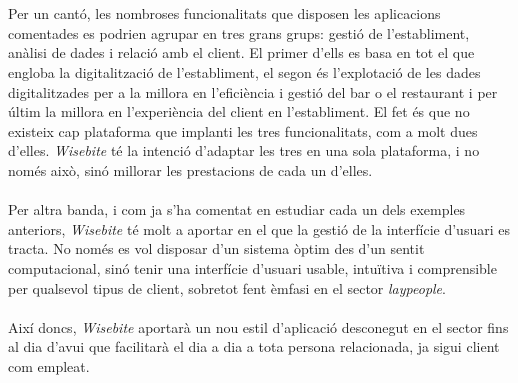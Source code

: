 \\\\
Per un cantó, les nombroses funcionalitats que disposen les aplicacions comentades es podrien agrupar en tres grans grups: gestió de l'establiment, anàlisi de dades i relació amb el client. El primer d'ells es basa en tot el que engloba la digitalització de l'establiment, el segon és l'explotació de les dades digitalitzades per a la millora en l'eficiència i gestió del bar o el restaurant i per últim la millora en l'experiència del client en l'establiment. El fet és que no existeix cap plataforma que implanti les tres funcionalitats, com a molt dues d'elles. \textit{Wisebite} té la intenció d'adaptar les tres en una sola plataforma, i no només això, sinó millorar les prestacions de cada un d'elles.
\\\\
Per altra banda, i com ja s'ha comentat en estudiar cada un dels exemples anteriors, \textit{Wisebite} té molt a aportar en el que la gestió de la interfície d'usuari es tracta. No només es vol disposar d'un sistema òptim des d'un sentit computacional, sinó tenir una interfície d'usuari usable, intuïtiva i comprensible per qualsevol tipus de client, sobretot fent èmfasi en el sector \textit{laypeople}.
\\\\
Així doncs, \textit{Wisebite} aportarà un nou estil d'aplicació desconegut en el sector fins al dia d'avui que facilitarà el dia a dia a tota persona relacionada, ja sigui client com empleat.